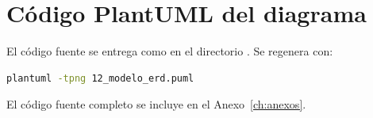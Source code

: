 \section{Código PlantUML del diagrama}

El código fuente se entrega como  en el directorio . Se regenera con:

\begin{lstlisting}[language=bash]
plantuml -tpng 12_modelo_erd.puml
\end{lstlisting}

El código fuente completo se incluye en el Anexo~\ref{ch:anexos}.
